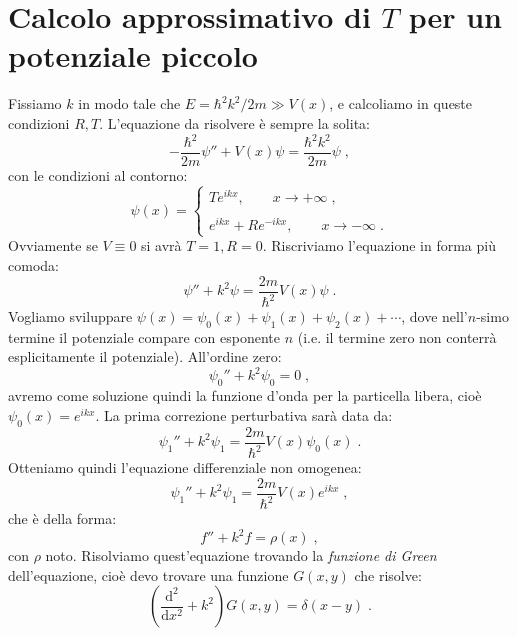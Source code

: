 \documentclass[10pt,a4paper]{report}
\theoremstyle{definition}
\numberwithin{equation}{section}
\newcommand{\diff}[1][]{\mathrm{d}#1}
\begin{document}
\section{Calcolo approssimativo di $T$ per un potenziale piccolo}
Fissiamo $k$ in modo tale che $E=\hbar^2k^2/2m\gg V(x)$, e calcoliamo in queste condizioni $R,T$. L'equazione da risolvere è sempre la solita:
\begin{equation}
-\frac{\hbar^2}{2m}\psi''+V(x)\psi=\frac{\hbar^2k^2}{2m}\psi\;,
\end{equation}
con le condizioni al contorno:
\begin{equation}
\psi(x)=\begin{cases}
Te^{ikx}, \qquad x\to+\infty\;, \\
\\
e^{ikx}+Re^{-ikx}, \qquad x\to-\infty\;.
\end{cases}
\end{equation}
Ovviamente se $V\equiv 0$ si avrà $T=1,R=0$. Riscriviamo l'equazione in forma più comoda:
\begin{equation}
\psi''+k^2\psi=\frac{2m}{\hbar^2}V(x)\psi\;.
\end{equation}
Vogliamo sviluppare $\psi(x)=\psi_0(x)+\psi_1(x)+\psi_2(x)+\cdots$, dove nell'$n$-simo termine il potenziale compare con esponente $n$ (i.e. il termine zero non conterrà esplicitamente il potenziale). All'ordine zero:
\begin{equation}
\psi_0''+k^2\psi_0=0\;,
\end{equation}
avremo come soluzione quindi la funzione d'onda per la particella libera, cioè $\psi_0(x)=e^{ikx}$. La prima correzione perturbativa sarà data da:
\begin{equation*}
\psi_1''+k^2\psi_1=\frac{2m}{\hbar^2}V(x)\psi_0(x)\;.
\end{equation*}
Otteniamo quindi l'equazione differenziale non omogenea:
\begin{equation}
\psi_1''+k^2\psi_1=\frac{2m}{\hbar^2}V(x)e^{ikx}\;,
\end{equation}
che è della forma:
\begin{equation}
f''+k^2f=\rho(x)\;, \label{ch5_firstorder}
\end{equation}
con $\rho$ noto. Risolviamo quest'equazione trovando la \textit{funzione di Green} dell'equazione, cioè devo trovare una funzione $G(x,y)$ che risolve:
\begin{equation}
\left(\frac{\diff^2}{\diff{x}^2}+k^2\right)G(x,y)=\delta(x-y)\;. \label{ch5_greenfunction}
\end{equation}
\end{document}
